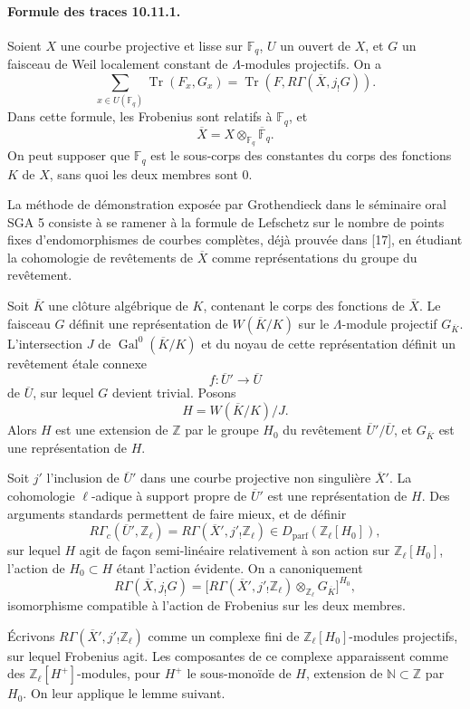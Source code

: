 \documentclass[10pt]{article}
\newcommand{\Z}{\mathbb Z}
\newcommand{\F}{\mathbb F}
\newcommand{\Gal}{\operatorname{Gal}}
\newcommand{\Tr}{\operatorname{Tr}}
\providecommand{\Gal}{\operatorname{Gal}}
\providecommand{\Gal}{\operatorname{Gal}}
\providecommand{\Tr}{\operatorname{Tr}}
\providecommand{\Dparf}{D_{\mathrm{parf}}}
\providecommand{\Gal}{\operatorname{Gal}}
\providecommand{\Tr}{\operatorname{Tr}}
\providecommand{\Gal}{\operatorname{Gal}}
\providecommand{\Tr}{\operatorname{Tr}}
\begin{document}
\paragraph{Formule des traces 10.11.1.} Soient \(X\) une courbe projective et lisse sur \(\F_q\), \(U\) un ouvert de \(X\), et \(G\) un faisceau de Weil localement constant de \(\Lambda\)-modules projectifs. On a
\[
\sum_{x\in U(\F_q)}\Tr(F_x,G_x)
=
\Tr(F,R\Gamma(\overline X,j_!G)).
\]
Dans cette formule, les Frobenius sont relatifs à \(\F_q\), et
\[
\overline X=X\otimes_{\F_q}\overline{\F}_q.
\]
On peut supposer que \(\F_q\) est le sous-corps des constantes du corps des fonctions \(K\) de \(X\), sans quoi les deux membres sont \(0\).

La méthode de démonstration exposée par Grothendieck dans le séminaire oral SGA 5 consiste à se ramener à la formule de Lefschetz sur le nombre de points fixes d'endomorphismes de courbes complètes, déjà prouvée dans [17], en étudiant la cohomologie de revêtements de \(\overline X\) comme représentations du groupe du revêtement.

Soit \(\overline K\) une clôture algébrique de \(K\), contenant le corps des fonctions de \(\overline X\). Le faisceau \(G\) définit une représentation de \(W(\overline K/K)\) sur le \(\Lambda\)-module projectif \(G_{\overline K}\). L'intersection \(J\) de \(\Gal^0(\overline K/K)\) et du noyau de cette représentation définit un revêtement étale connexe
\[
f:\overline U'\longrightarrow \overline U
\]
de \(\overline U\), sur lequel \(G\) devient trivial. Posons
\[
H=W(\overline K/K)/J.
\]
Alors \(H\) est une extension de \(\Z\) par le groupe \(H_0\) du revêtement \(\overline U'/\overline U\), et \(G_{\overline K}\) est une représentation de \(H\).

Soit \(j'\) l'inclusion de \(\overline U'\) dans une courbe projective non singulière \(\overline X'\). La cohomologie \(\ell\)-adique à support propre de \(\overline U'\) est une représentation de \(H\). Des arguments standards permettent de faire mieux, et de définir
\[
R\Gamma_c(\overline U',\Z_\ell)
=
R\Gamma(\overline X',j'_!\Z_\ell)
\in\Dparf(\Z_\ell[H_0]),
\]
sur lequel \(H\) agit de façon semi-linéaire relativement à son action sur \(\Z_\ell[H_0]\), l'action de \(H_0\subset H\) étant l'action évidente. On a canoniquement
\[
\tag{10.11.2}
R\Gamma(\overline X,j_!G)
=
\bigl[
R\Gamma(\overline X',j'_!\Z_\ell)
\otimes_{\Z_\ell}G_{\overline K}
\bigr]^{H_0},
\]
isomorphisme compatible à l'action de Frobenius sur les deux membres.

Écrivons \(R\Gamma(\overline X',j'_!\Z_\ell)\) comme un complexe fini de \(\Z_\ell[H_0]\)-modules projectifs, sur lequel Frobenius agit. Les composantes de ce complexe apparaissent comme des \(\Z_\ell[H^+]\)-modules, pour \(H^+\) le sous-monoïde de \(H\), extension de \(\mathbb N\subset\Z\) par \(H_0\). On leur applique le lemme suivant.
\end{document}
